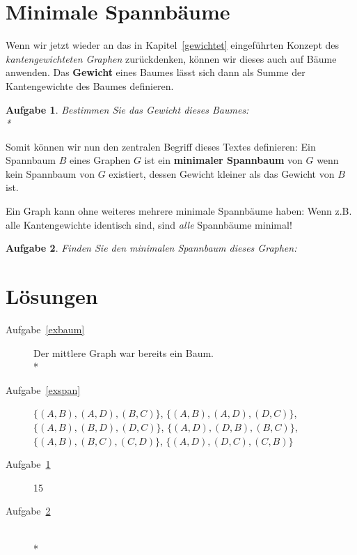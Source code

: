 \documentclass[12pt,a4paper]{report}
\theoremstyle{break}
\newtheorem{exercise}{Aufgabe}[section]
\theoremstyle{plain}
\begin{document}
\section{Minimale Spannb\"{a}ume}

Wenn wir jetzt wieder an das in Kapitel~\ref{gewichtet}
eingef\"{u}hrten Konzept des \emph{kantengewichteten Graphen}
zur\"{u}ckdenken, k\"{o}nnen wir dieses auch auf B\"{a}ume
anwenden. Das \textbf{Gewicht} eines Baumes l\"{a}sst sich dann als
Summe der Kantengewichte des Baumes definieren.

\begin{exercise}\label{exgewicht}
Bestimmen Sie das Gewicht dieses Baumes:\\*
\nopagebreak{}
\end{exercise}

Somit k\"{o}nnen wir nun den zentralen Begriff dieses Textes
definieren: Ein Spannbaum $B$ eines Graphen $G$ ist ein
\textbf{minimaler Spannbaum} von $G$ wenn kein Spannbaum von $G$
existiert, dessen Gewicht kleiner als das Gewicht von $B$ ist.

Ein Graph kann ohne weiteres mehrere minimale Spannb\"{a}ume haben:
Wenn z.B. alle Kantengewichte identisch sind, sind \emph{alle}
Spannb\"{a}ume minimal!


\begin{exercise}\label{exspangewicht}
Finden Sie den minimalen Spannbaum dieses Graphen:

\end{exercise}

\section{L\"{o}sungen}

\begin{description}
\item[Aufgabe~\ref{exbaum}] Der mittlere Graph war bereits ein Baum.\\*
\item[Aufgabe~\ref{exspan}] $\{(A,B), (A,D), (B,C)\}$, $\{(A,B), (A,D),
  (D,C)\}$, $\{(A,B), (B,D), (D,C)\}$, $\{(A,D), (D,B), (B,C)\}$, $\{(A,B),
  (B,C), (C,D)\}$, $\{(A,D), (D,C), (C,B)\}$
\item[Aufgabe~\ref{exgewicht}] 15
\item[Aufgabe~\ref{exspangewicht}]\hfill\\*

\end{description}
\end{document}
